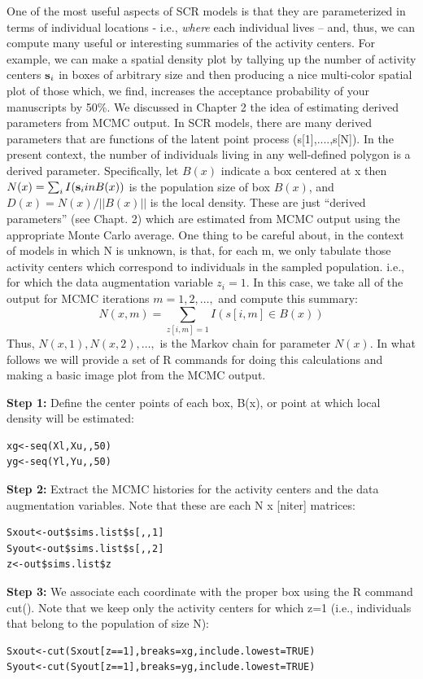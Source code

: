 One of the most useful aspects of SCR models is that they are
parameterized in terms of individual locations - i.e., {\it where}
each individual lives -- and, thus, we can compute many useful or interesting summaries of the activity centers.  For example, we can make a spatial density plot by tallying up the number of activity centers ${\bf s}_{i}$ in boxes of arbitrary size and then producing a nice multi-color spatial plot of those which, we find, increases the acceptance probability of your manuscripts by 50\%. 
We discussed in Chapter 2 the idea of estimating derived parameters from MCMC output. In SCR models, there are many derived parameters that are functions of the latent point process (s[1],....,s[N]). In the present context, the number of individuals living in any well-defined polygon is a derived parameter. Specifically, let $B(x)$ indicate a box centered at x then $N(x)=\sum_{i} I({\bf s}_{i} in B(x))$ is the population size of box $B(x)$, and $D(x) = N(x)/||B(x)||$ is the local density. These are just ``derived parameters'' (see Chapt. 2) which are estimated from MCMC output using the appropriate Monte Carlo average. One thing to be careful about, in the context of models in which N is unknown, is that, for each m, we only tabulate those activity centers which correspond to individuals in the sampled population. i.e., for which the data augmentation variable $z_{i}  = 1$.  In this case, we take all of the output for MCMC iterations $m=1,2,\ldots,$ and compute this summary:
\[
   N(x,m) = \sum_{z[i,m]=1} I(s[i,m] \in B(x))
\]
Thus, $N(x,1),N(x,2),\dots,$ is the Markov chain for parameter $N(x)$.  In what follows we will provide a set of R commands for doing this calculations and making a basic image plot from the MCMC output. 

{\flushleft \bf Step 1:} Define the center points of each box, B(x), or point at which local density will be estimated:
\begin{verbatim}
xg<-seq(Xl,Xu,,50)
yg<-seq(Yl,Yu,,50)
\end{verbatim}

{\flushleft \bf Step 2:} Extract the MCMC histories for the activity centers and the data augmentation variables.  Note that these are each N x [niter] matrices:
\begin{verbatim}
Sxout<-out$sims.list$s[,,1]
Syout<-out$sims.list$s[,,2]
z<-out$sims.list$z
\end{verbatim}

{\flushleft \bf Step 3:} We associate each coordinate with the proper box using the R command cut(). Note that we keep only the activity centers for which z=1 (i.e., individuals that belong to the population of size N):
\begin{verbatim}
Sxout<-cut(Sxout[z==1],breaks=xg,include.lowest=TRUE)
Syout<-cut(Syout[z==1],breaks=yg,include.lowest=TRUE)
\end{verbatim}

